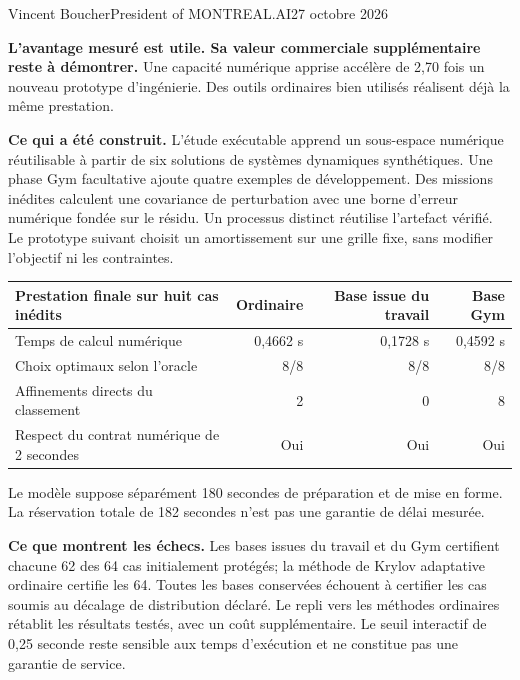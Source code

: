 \documentclass[10pt,letterpaper]{article}
\begin{document}
{\large Vincent Boucher}\quad President of MONTREAL.AI\hfill 27 octobre 2026

\colorbox{pale}{\parbox{0.95\linewidth}{\vspace{7pt}\textbf{L'avantage mesuré est utile. Sa valeur commerciale supplémentaire reste à démontrer.} Une capacité numérique apprise accélère de 2,70 fois un nouveau prototype d'ingénierie. Des outils ordinaires bien utilisés réalisent déjà la même prestation.\vspace{7pt}}}

\textbf{Ce qui a été construit.} L'étude exécutable apprend un sous-espace numérique réutilisable à partir de six solutions de systèmes dynamiques synthétiques. Une phase Gym facultative ajoute quatre exemples de développement. Des missions inédites calculent une covariance de perturbation avec une borne d'erreur numérique fondée sur le résidu. Un processus distinct réutilise l'artefact vérifié. Le prototype suivant choisit un amortissement sur une grille fixe, sans modifier l'objectif ni les contraintes.

\begin{center}\begin{tabularx}{\linewidth}{Yrrr}\toprule
Prestation finale sur huit cas inédits & Ordinaire & Base issue du travail & Base Gym\\\midrule
Temps de calcul numérique &0,4662 s&0,1728 s&0,4592 s\\
Choix optimaux selon l'oracle &8/8&8/8&8/8\\
Affinements directs du classement &2&0&8\\
Respect du contrat numérique de 2 secondes &Oui&Oui&Oui\\\bottomrule
\end{tabularx}\end{center}

{\small Le modèle suppose séparément 180 secondes de préparation et de mise en forme. La réservation totale de 182 secondes n'est pas une garantie de délai mesurée.}

\textbf{Ce que montrent les échecs.} Les bases issues du travail et du Gym certifient chacune 62 des 64 cas initialement protégés; la méthode de Krylov adaptative ordinaire certifie les 64. Toutes les bases conservées échouent à certifier les cas soumis au décalage de distribution déclaré. Le repli vers les méthodes ordinaires rétablit les résultats testés, avec un coût supplémentaire. Le seuil interactif de 0,25 seconde reste sensible aux temps d'exécution et ne constitue pas une garantie de service.
\end{document}
